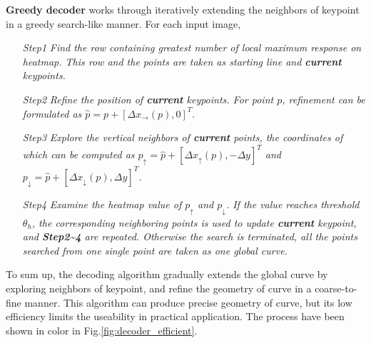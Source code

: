 \documentclass[final]{cvpr}
\begin{document}
\textbf{Greedy decoder} works through iteratively extending the neighbors of keypoint in a greedy search-like manner. For each input image,
\begin{itemize}[itemindent=1em]
    \item [\textsl{Step1}]
        \textsl{Find the row containing greatest number of local maximum response on heatmap. This row and the points are taken as starting line and \textbf{current} keypoints.}
    
    \item [\textsl{Step2}]
        \textsl{Refine the position of \textbf{current} keypoints. For point $p$, refinement can be formulated as $\hat{p}=p+[\Delta{x_{\rightarrow}}(p),0]^T$}.
    
    \item [\textsl{Step3}]
        \textsl{Explore the vertical neighbors of \textbf{current} points, the coordinates of which can be computed as $p_{\uparrow}=\hat{p}+[\Delta{x_{\uparrow}}(p),-\Delta{y}]^T$ and $p_{\downarrow}=\hat{p}+[\Delta{x_{\downarrow}}(p),\Delta{y}]^T$. }
    
    \item [\textsl{Step4}]
        \textsl{Examine the heatmap value of $p_{\uparrow}$ and $p_{\downarrow}$. If the value reaches threshold $\theta_h$, the corresponding neighboring points is used to update \textbf{current} keypoint, and \textbf{Step2\textasciitilde4} are repeated. Otherwise the search is terminated, all the points searched from one single point are taken as one global curve.}
    
\end{itemize}
To sum up, the decoding algorithm gradually extends the global curve by exploring neighbors of keypoint, and refine the geometry of curve in a coarse-to-fine manner. This algorithm can produce precise geometry of curve, but its low efficiency limits the useability in practical application.
The process have been shown in color in Fig.\ref{fig:decoder_efficient}.
\end{document}
